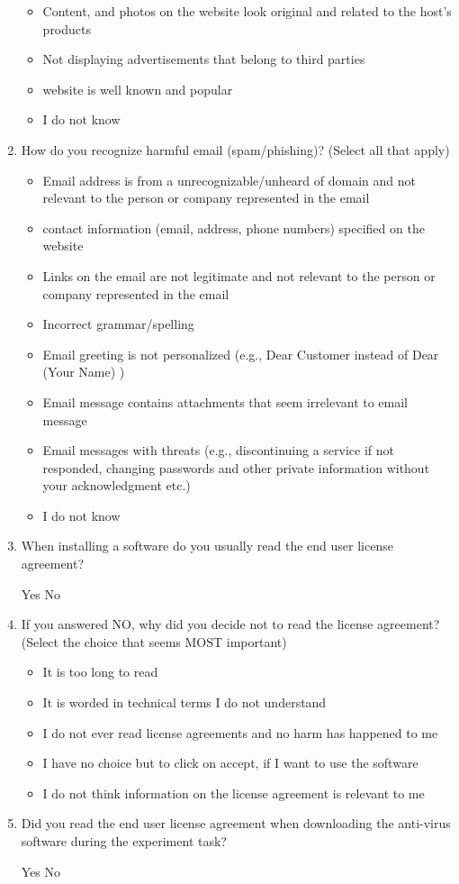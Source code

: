 \begin{enumerate}[noitemsep]
\begin{itemize}[topsep=-6em, label={o}]
\item Content, and photos on the website look original and related to the host's products
\item Not displaying advertisements that belong to third parties
\item website is well known and popular
\item I do not know
\end{itemize}
\item How do you recognize harmful email (spam/phishing)? (Select all that apply)
\begin{itemize}[topsep=-6em, label={o}]
\itemsep-1em 
\item Email address is from a unrecognizable/unheard of domain and not relevant to the person or company represented in the email
\item contact information (email, address, phone numbers) specified on the website
\item Links on the email are not legitimate and not relevant to the person or company represented in the email
\item Incorrect grammar/spelling
\item Email greeting is not personalized (e.g., Dear Customer instead of Dear (Your Name) )
\item Email message contains attachments that seem irrelevant to email message
\item Email messages with threats (e.g., discontinuing a service if not responded, changing passwords and other private information without your acknowledgment etc.)
\item I do not know
\end{itemize}
\item  When installing a software do you usually read the end user license agreement?
\par Yes \hspace{1cm} No
\item If you answered NO, why did you decide not to read the license agreement? (Select the choice that seems MOST important)
\begin{itemize}[topsep=-6em, label={o}]
\itemsep-1em 
\item It is too long to read
\item It is worded in technical terms I do not understand
\item I do not ever read license agreements and no harm has happened to me
\item I have no choice but to click on accept, if I want to use the software
\item I do not think information on the license agreement is relevant to me
\end{itemize}
\item  Did you read the end user license agreement when downloading the anti-virus software during the experiment task?
\par Yes \hspace{1cm} No
\end{enumerate}
